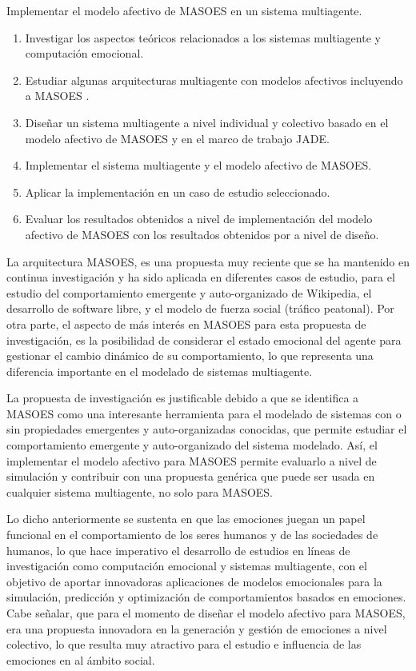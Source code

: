Implementar el modelo afectivo de MASOES en un sistema multiagente.


\begin{enumerate}
\item Investigar los aspectos teóricos relacionados a los sistemas multiagente y computación emocional.
\item Estudiar algunas arquitecturas multiagente con modelos afectivos incluyendo a MASOES \citep{perozo2011}.
\item Diseñar un sistema multiagente a nivel individual y colectivo basado en el modelo afectivo de MASOES y en el marco de trabajo JADE.
\item Implementar el sistema multiagente y el modelo afectivo de MASOES.
\item Aplicar la implementación en un caso de estudio seleccionado.
\item Evaluar los resultados obtenidos a nivel de implementación del modelo afectivo de MASOES con los resultados obtenidos por \cite{perozo2011} a nivel de diseño.
\end{enumerate}


La arquitectura MASOES, es una propuesta muy reciente que se ha mantenido en
continua investigación y ha sido aplicada en diferentes casos de estudio, para
el estudio del comportamiento emergente y auto-organizado de Wikipedia, el
desarrollo de software libre, y el modelo de fuerza social (tráfico peatonal).
Por otra parte, el aspecto de más interés en MASOES para esta propuesta de
investigación, es la posibilidad de considerar el estado emocional del agente
para gestionar el cambio dinámico de su comportamiento, lo que representa una
diferencia importante en el modelado de sistemas multiagente.

La propuesta de investigación es justificable debido a que se identifica a
MASOES como una interesante herramienta para el modelado de sistemas con o sin
propiedades emergentes y auto-organizadas conocidas, que permite estudiar el
comportamiento emergente y auto-organizado del sistema modelado. Así, el
implementar el modelo afectivo para MASOES permite evaluarlo a nivel de
simulación y contribuir con una propuesta genérica que puede ser usada en
cualquier sistema multiagente, no solo para MASOES.

Lo dicho anteriormente se sustenta en que las emociones juegan un papel
funcional en el comportamiento de los seres humanos y de las sociedades de
humanos, lo que hace imperativo el desarrollo de estudios en líneas de
investigación como  computación emocional y sistemas multiagente, con el
objetivo de aportar innovadoras aplicaciones de modelos emocionales para la
simulación, predicción y optimización de comportamientos basados en emociones.
Cabe señalar, que para el momento de diseñar el modelo afectivo para MASOES, era
una propuesta innovadora en la generación y gestión de emociones a nivel
colectivo, lo que resulta muy atractivo para el estudio e influencia de las
emociones en al ámbito social.

